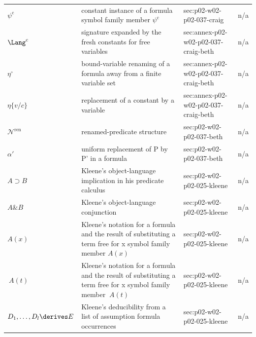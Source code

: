 \begin{longtable}{@{}p{}p{}p{}p{}@{}}
\(\psi^{\mathrm{c}}\) & constant instance of a formula symbol family member \(\psi^{\mathrm{c}}\) & sec:\allowbreak{}p02-\allowbreak{}w02-\allowbreak{}p02-\allowbreak{}037-\allowbreak{}craig & n/a \\
\(\Lang^{\mathrm{c}}\) & signature expanded by the fresh constants for free variables & sec:\allowbreak{}annex-\allowbreak{}p02-\allowbreak{}w02-\allowbreak{}p02-\allowbreak{}037-\allowbreak{}craig-\allowbreak{}beth & n/a \\
\(\eta^{\circ}\) & bound-variable renaming of a formula away from a finite variable set & sec:\allowbreak{}annex-\allowbreak{}p02-\allowbreak{}w02-\allowbreak{}p02-\allowbreak{}037-\allowbreak{}craig-\allowbreak{}beth & n/a \\
\(\eta\{v/c\}\) & replacement of a constant by a variable & sec:\allowbreak{}annex-\allowbreak{}p02-\allowbreak{}w02-\allowbreak{}p02-\allowbreak{}037-\allowbreak{}craig-\allowbreak{}beth & n/a \\
\(\mathcal N^{\mathrm{ren}}\) & renamed-predicate structure & sec:\allowbreak{}p02-\allowbreak{}w02-\allowbreak{}p02-\allowbreak{}037-\allowbreak{}beth & n/a \\
\(\alpha'\) & uniform replacement of P by P' in a formula & sec:\allowbreak{}p02-\allowbreak{}w02-\allowbreak{}p02-\allowbreak{}037-\allowbreak{}beth & n/a \\
\(A\supset B\) & Kleene's object-language implication in his predicate calculus & sec:\allowbreak{}p02-\allowbreak{}w02-\allowbreak{}p02-\allowbreak{}025-\allowbreak{}kleene & n/a \\
\(A\mathbin{\&}B\) & Kleene's object-language conjunction & sec:\allowbreak{}p02-\allowbreak{}w02-\allowbreak{}p02-\allowbreak{}025-\allowbreak{}kleene & n/a \\
\(A(x)\) & Kleene's notation for a formula and the result of substituting a term free for x symbol family member \(A(x)\) & sec:\allowbreak{}p02-\allowbreak{}w02-\allowbreak{}p02-\allowbreak{}025-\allowbreak{}kleene & n/a \\
\(\ A(t)\) & Kleene's notation for a formula and the result of substituting a term free for x symbol family member \(\ A(t)\) & sec:\allowbreak{}p02-\allowbreak{}w02-\allowbreak{}p02-\allowbreak{}025-\allowbreak{}kleene & n/a \\
\(D_1,\allowbreak \ldots,\allowbreak D_l\derives E\) & Kleene's deducibility from a list of assumption formula occurrences & sec:\allowbreak{}p02-\allowbreak{}w02-\allowbreak{}p02-\allowbreak{}025-\allowbreak{}kleene & n/a \\

\end{longtable}
